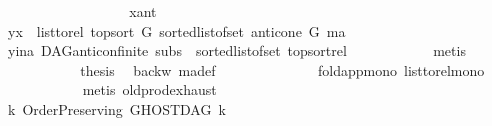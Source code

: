 \begin{isabellebody}
\ \ \ \ \ \ \ \ \isamarkupfalse%
\isanewline
\ \ \ \ \ \ \ \ \isamarkupfalse%
\ x{\isacharunderscore}{\kern0pt}ant\isanewline
\ \ \ \ \ \ \ \ \isamarkupfalse%
\ \isamarkupfalse%
\ {\isachardoublequoteopen}{\isacharparenleft}{\kern0pt}y{\isacharcomma}{\kern0pt}x{\isacharparenright}{\kern0pt}\ {\isasymin}\ list{\isacharunderscore}{\kern0pt}to{\isacharunderscore}{\kern0pt}rel\ {\isacharparenleft}{\kern0pt}top{\isacharunderscore}{\kern0pt}sort\ G\ {\isacharparenleft}{\kern0pt}sorted{\isacharunderscore}{\kern0pt}list{\isacharunderscore}{\kern0pt}of{\isacharunderscore}{\kern0pt}set\ {\isacharparenleft}{\kern0pt}anticone\ G\ ma{\isacharparenright}{\kern0pt}{\isacharparenright}{\kern0pt}{\isacharparenright}{\kern0pt}{\isachardoublequoteclose}\isanewline
\ \ \ \ \ \ \ \ \ \ \isamarkupfalse%
\ y{\isacharunderscore}{\kern0pt}ina\ DAG{\isachardot}{\kern0pt}anticon{\isacharunderscore}{\kern0pt}finite\ subs\ {}{\isacharparenleft}{\kern0pt}{}{\isacharcomma}{\kern0pt}{}{\isacharparenright}{\kern0pt}\ sorted{\isacharunderscore}{\kern0pt}list{\isacharunderscore}{\kern0pt}of{\isacharunderscore}{\kern0pt}set{\isacharparenleft}{\kern0pt}{}{\isacharparenright}{\kern0pt}\ top{\isacharunderscore}{\kern0pt}sort{\isacharunderscore}{\kern0pt}rel\isanewline
\ \ \ \ \ \ \ \ \ \ \isamarkupfalse%
\ metis\isanewline
\ \ \ \ \ \ \ \ \isamarkupfalse%
\ \isamarkupfalse%
\ {\isacharquery}{\kern0pt}thesis\ \isamarkupfalse%
\ backw\ ma{\isacharunderscore}{\kern0pt}def\ \ \isamarkupfalse%
\isanewline
\ \ \ \ \ \ \ \ \ \ \ \ fold{\isacharunderscore}{\kern0pt}app{\isacharunderscore}{\kern0pt}mono\ list{\isacharunderscore}{\kern0pt}to{\isacharunderscore}{\kern0pt}rel{\isacharunderscore}{\kern0pt}mono{}\isanewline
\ \ \ \ \ \ \ \ \ \ \isamarkupfalse%
\ {\isacharparenleft}{\kern0pt}metis\ old{\isachardot}{\kern0pt}prod{\isachardot}{\kern0pt}exhaust{\isacharparenright}{\kern0pt}\isanewline
\ \ \ \ \ \ \isamarkupfalse%
\isanewline
\ \ \ \ \isamarkupfalse%
\isanewline
\ \ \isamarkupfalse%
\isanewline
{}\isamarkupfalse%
%
\endisatagproof
{\isafoldproof}%
%
\isadelimproof
\isanewline
%
\endisadelimproof
\isanewline
\isanewline
{}\isamarkupfalse%
\ {\isachardoublequoteopen}{\isasymforall}k{\isachardot}{\kern0pt}\ Order{\isacharunderscore}{\kern0pt}Preserving\ {\isacharparenleft}{\kern0pt}GHOSTDAG\ k{\isacharparenright}{\kern0pt}{\isachardoublequoteclose}\isanewline

\end{isabellebody}
